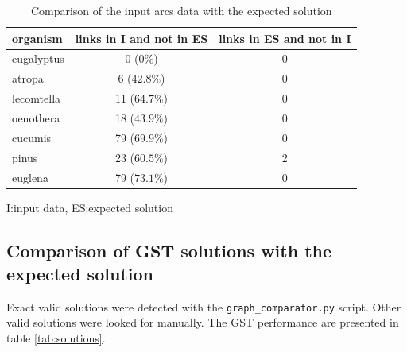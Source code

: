 \documentclass[12pt]{article}
\begin{document}
\begin{table}[h!]
\centering
\begin{tabular}{|l||c| c|}
\hline
organism & links in I and not in ES & links in ES and not in I \\
\hline
eugalyptus & 0 ($0\%$) & 0 \\
atropa & 6 ($42.8\%$) & 0 \\
lecomtella & 11 ($64.7\%$) & 0 \\
oenothera & 18 ($43.9\%$) & 0 \\
cucumis & 79 ($69.9\%$) & 0 \\
pinus & 23 ($60.5\%$)& 2 \\
euglena & 79 ($73.1\%$) & 0 \\
\hline
\end{tabular}
\caption{Comparison of the input arcs data with the expected solution}
\footnotesize {\color{magenta}I}:input data, {\color{magenta}ES}:expected solution
\label{tab:compgsi}
\end{table}



\subsection{Comparison of GST solutions with the expected solution}

Exact valid solutions were detected with the \texttt{graph\_comparator.py} script. Other valid solutions were looked for manually. The GST performance are presented in table \ref{tab:solutions}. 
\end{document}
